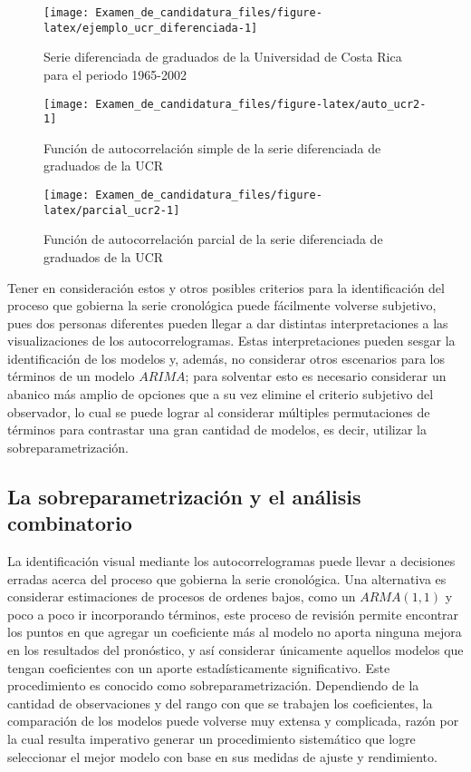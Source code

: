 \documentclass[
]{article}
\begin{document}
\begin{figure}[H]
\texttt{[image: Examen\_de\_candidatura\_files/figure-latex/ejemplo\_ucr\_diferenciada-1]} \caption{Serie diferenciada de graduados de la Universidad de Costa Rica para el periodo 1965-2002}\label{fig:ejemplo_ucr_diferenciada}
\end{figure}

\begin{figure}[H]
\texttt{[image: Examen\_de\_candidatura\_files/figure-latex/auto\_ucr2-1]} \caption{Función de autocorrelación simple de la serie diferenciada de graduados de la UCR}\label{fig:auto_ucr2}
\end{figure}

\begin{figure}[H]
\texttt{[image: Examen\_de\_candidatura\_files/figure-latex/parcial\_ucr2-1]} \caption{Función de autocorrelación parcial de la serie diferenciada de graduados de la UCR}\label{fig:parcial_ucr2}
\end{figure}

Tener en consideración estos y otros posibles criterios para la
identificación del proceso que gobierna la serie cronológica puede
fácilmente volverse subjetivo, pues dos personas diferentes pueden
llegar a dar distintas interpretaciones a las visualizaciones de los
autocorrelogramas. Estas interpretaciones pueden sesgar la
identificación de los modelos y, además, no considerar otros escenarios
para los términos de un modelo \(ARIMA\); para solventar esto es
necesario considerar un abanico más amplio de opciones que a su vez
elimine el criterio subjetivo del observador, lo cual se puede lograr al
considerar múltiples permutaciones de términos para contrastar una gran
cantidad de modelos, es decir, utilizar la sobreparametrización.

\subsection{La sobreparametrización y el análisis combinatorio}

La identificación visual mediante los autocorrelogramas puede llevar a
decisiones erradas acerca del proceso que gobierna la serie cronológica.
Una alternativa es considerar estimaciones de procesos de ordenes bajos,
como un \(ARMA(1,1)\) y poco a poco ir incorporando términos, este
proceso de revisión permite encontrar los puntos en que agregar un
coeficiente más al modelo no aporta ninguna mejora en los resultados del
pronóstico, y así considerar únicamente aquellos modelos que tengan
coeficientes con un aporte estadísticamente significativo. Este
procedimiento es conocido como sobreparametrización. Dependiendo de la
cantidad de observaciones y del rango con que se trabajen los
coeficientes, la comparación de los modelos puede volverse muy extensa y
complicada, razón por la cual resulta imperativo generar un
procedimiento sistemático que logre seleccionar el mejor modelo con base
en sus medidas de ajuste y rendimiento.
\end{document}
